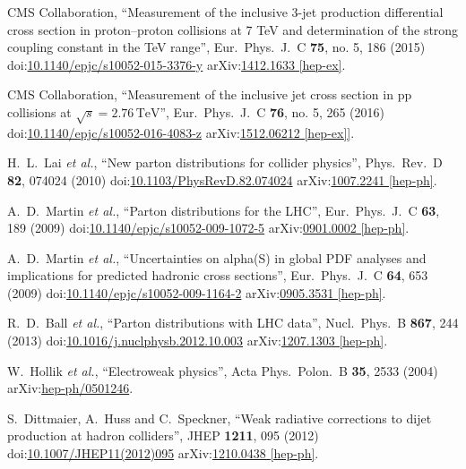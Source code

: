 \begin{thebibliography}{99}
CMS Collaboration, ``Measurement of the inclusive 3-jet production differential cross section in proton–proton collisions at 7 TeV and determination of the strong coupling constant in the TeV range'', Eur.\ Phys.\ J.\ C {\bf 75}, no. 5, 186 (2015) doi:\href{http://dx.doi.org/10.1140/epjc/s10052-015-3376-y}{10.1140/epjc/s10052-015-3376-y} arXiv:\href{https://arxiv.org/abs/1412.1633}{1412.1633 [hep-ex]}.

CMS Collaboration, ``Measurement of the inclusive jet cross section in pp collisions at $\sqrt{s} = 2.76\,\text {TeV}$'', Eur.\ Phys.\ J.\ C {\bf 76}, no. 5, 265 (2016) doi:\href{http://dx.doi.org/10.1140/epjc/s10052-016-4083-z}{10.1140/epjc/s10052-016-4083-z} arXiv:\href{https://arxiv.org/abs/1512.06212}{1512.06212 [hep-ex]]}.

H.~L.~Lai {\it et al.}, ``New parton distributions for collider physics'', Phys.\ Rev.\ D {\bf 82}, 074024 (2010) doi:\href{http://dx.doi.org/10.1103/PhysRevD.82.074024}{10.1103/PhysRevD.82.074024} arXiv:\href{https://arxiv.org/abs/1007.2241}{1007.2241 [hep-ph]}.

A.~D.~Martin {\it et al.}, ``Parton distributions for the LHC'', Eur.\ Phys.\ J.\ C {\bf 63}, 189 (2009) doi:\href{http://dx.doi.org/10.1140/epjc/s10052-009-1072-5}{10.1140/epjc/s10052-009-1072-5} arXiv:\href{https://arxiv.org/abs/0901.0002}{0901.0002 [hep-ph]}.

A.~D.~Martin {\it et al.}, ``Uncertainties on alpha(S) in global PDF analyses and implications for predicted hadronic cross sections'', Eur.\ Phys.\ J.\ C {\bf 64}, 653 (2009) doi:\href{http://dx.doi.org/10.1140/epjc/s10052-009-1164-2}{10.1140/epjc/s10052-009-1164-2} arXiv:\href{https://arxiv.org/abs/0905.3531}{0905.3531 [hep-ph]}.

R.~D.~Ball {\it et al.}, ``Parton distributions with LHC data'', Nucl.\ Phys.\ B {\bf 867}, 244 (2013) doi:\href{http://dx.doi.org/10.1016/j.nuclphysb.2012.10.003}{10.1016/j.nuclphysb.2012.10.003} arXiv:\href{https://arxiv.org/abs/1207.1303}{1207.1303 [hep-ph]}.

W.~Hollik {\it et al.}, ``Electroweak physics'', Acta Phys.\ Polon.\ B {\bf 35}, 2533 (2004) arXiv:\href{https://arxiv.org/abs/hep-ph/0501246}{hep-ph/0501246}.
 
S.~Dittmaier, A.~Huss and C.~Speckner, ``Weak radiative corrections to dijet production at hadron colliders'', JHEP {\bf 1211}, 095 (2012) doi:\href{http://dx.doi.org/10.1007/JHEP11(2012)095}{10.1007/JHEP11(2012)095} arXiv:\href{https://arxiv.org/abs/1210.0438}{1210.0438 [hep-ph]}.


\end{thebibliography}

